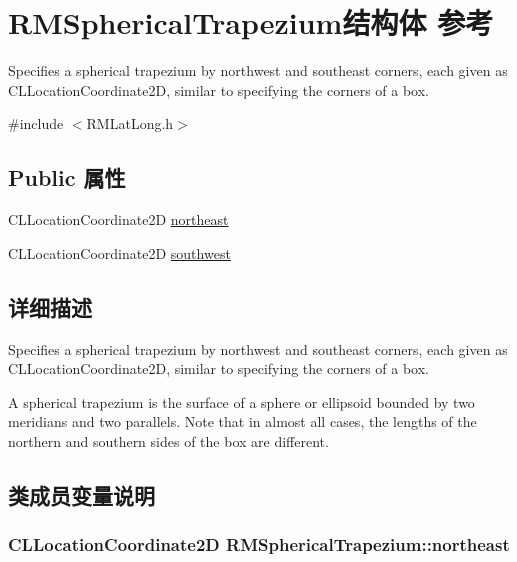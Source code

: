 \hypertarget{struct_r_m_spherical_trapezium}{\section{R\-M\-Spherical\-Trapezium结构体 参考}
\label{struct_r_m_spherical_trapezium}
}


Specifies a spherical trapezium by northwest and southeast corners, each given as C\-L\-Location\-Coordinate2\-D, similar to specifying the corners of a box.  




{\ttfamily \#include $<$R\-M\-Lat\-Long.\-h$>$}

\subsection*{Public 属性}
\begin{DoxyCompactItemize}
\item 
C\-L\-Location\-Coordinate2\-D \hyperlink{struct_r_m_spherical_trapezium_ad513ce4af93003021ec46adb0286b717}{northeast}
\item 
C\-L\-Location\-Coordinate2\-D \hyperlink{struct_r_m_spherical_trapezium_a65544ba36cbd0ae7f67634a6d55751ef}{southwest}
\end{DoxyCompactItemize}


\subsection{详细描述}
Specifies a spherical trapezium by northwest and southeast corners, each given as C\-L\-Location\-Coordinate2\-D, similar to specifying the corners of a box. 

A spherical trapezium is the surface of a sphere or ellipsoid bounded by two meridians and two parallels. Note that in almost all cases, the lengths of the northern and southern sides of the box are different. 

\subsection{类成员变量说明}
\hypertarget{struct_r_m_spherical_trapezium_ad513ce4af93003021ec46adb0286b717}{
\subsubsection[{northeast}]{\setlength{\rightskip}{0pt plus 5cm}C\-L\-Location\-Coordinate2\-D R\-M\-Spherical\-Trapezium\-::northeast}}\label{struct_r_m_spherical_trapezium_ad513ce4af93003021ec46adb0286b717}


